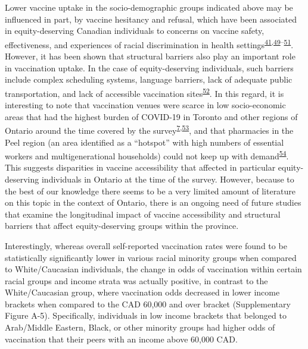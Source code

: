 \documentclass[
  letterpaper,
  DIV=11,
  numbers=noendperiod]{scrartcl}
\begin{document}
Lower vaccine uptake in the socio-demographic groups indicated above may
be influenced in part, by vaccine hesitancy and refusal, which have been
associated in equity-deserving Canadian individuals to concerns on
vaccine safety, effectiveness, and experiences of racial discrimination
in health
settings\textsuperscript{\protect\hyperlink{ref-cnat2022a}{41},\protect\hyperlink{ref-basta2022}{49}--\protect\hyperlink{ref-cnat2023}{51}}.
However, it has been shown that structural barriers also play an
important role in vaccination uptake. In the case of equity-deserving
individuals, such barriers include complex scheduling systems, language
barriers, lack of adequate public transportation, and lack of accessible
vaccination
sites\textsuperscript{\protect\hyperlink{ref-njoku2021}{52}}. In this
regard, it is interesting to note that vaccination venues were scarce in
low socio-economic areas that had the highest burden of COVID-19 in
Toronto and other regions of Ontario around the time covered by the
survey\textsuperscript{\protect\hyperlink{ref-bogoch2022}{7},\protect\hyperlink{ref-iveniuk2021}{53}},
and that pharmacies in the Peel region (an area identified as a
``hotspot'' with high numbers of essential workers and multigenerational
households) could not keep up with
demand\textsuperscript{\protect\hyperlink{ref-gill2022}{54}}. This
suggests disparities in vaccine accessibility that affected in
particular equity-deserving individuals in Ontario at the time of the
survey. However, because to the best of our knowledge there seems to be
a very limited amount of literature on this topic in the context of
Ontario, there is an ongoing need of future studies that examine the
longitudinal impact of vaccine accessibility and structural barriers
that affect equity-deserving groups within the province.

Interestingly, whereas overall self-reported vaccination rates were
found to be statistically significantly lower in various racial minority
groups when compared to White/Caucasian individuals, the change in odds
of vaccination within certain racial groups and income strata was
actually positive, in contrast to the White/Caucasian group, where
vaccination odds decreased in lower income brackets when compared to the
CAD 60,000 and over bracket (Supplementary Figure A-5). Specifically,
individuals in low income brackets that belonged to Arab/Middle Eastern,
Black, or other minority groups had higher odds of vaccination that
their peers with an income above 60,000 CAD.
\end{document}
